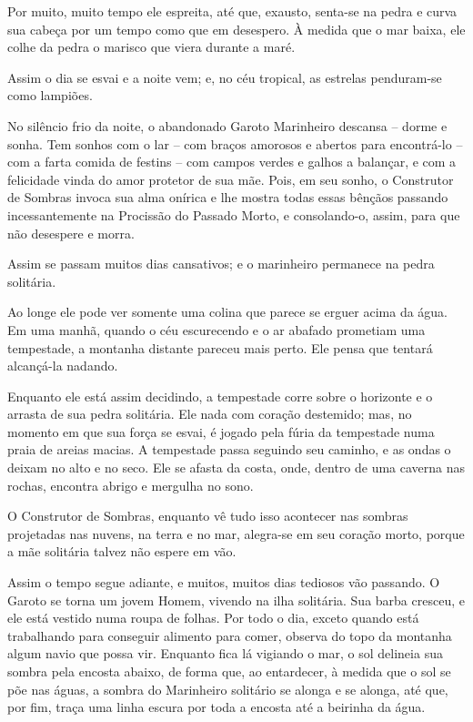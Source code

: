 Por muito, muito tempo ele espreita, até que, exausto, senta-se na pedra
e curva sua cabeça por um tempo como que em desespero. À medida que o
mar baixa, ele colhe da pedra o marisco que viera durante a maré.

Assim o dia se esvai e a noite vem; e, no céu tropical, as estrelas
penduram-se como lampiões.

No silêncio frio da noite, o abandonado Garoto Marinheiro descansa --
dorme e sonha. Tem sonhos com o lar -- com braços amorosos e abertos
para encontrá-lo -- com a farta comida de festins -- com campos verdes e
galhos a balançar, e com a felicidade vinda do amor protetor de sua mãe.
Pois, em seu sonho, o Construtor de Sombras invoca sua alma onírica e
lhe mostra todas essas bênçãos passando incessantemente na Procissão do
Passado Morto, e consolando-o, assim, para que não desespere e morra.

\smallskip
Assim se passam muitos dias cansativos; e o marinheiro permanece na
pedra solitária.

Ao longe ele pode ver somente uma colina que parece se erguer acima da
água. Em uma manhã, quando o céu escurecendo e o ar abafado prometiam
uma tempestade, a montanha distante pareceu mais perto. Ele pensa que
tentará alcançá-la nadando.

Enquanto ele está assim decidindo, a tempestade corre sobre o horizonte
e o arrasta de sua pedra solitária. Ele nada com coração destemido; mas,
no momento em que sua força se esvai, é jogado pela fúria da tempestade
numa praia de areias macias. A tempestade passa seguindo seu caminho, e
as ondas o deixam no alto e no seco. Ele se afasta da costa, onde,
dentro de uma caverna nas rochas, encontra abrigo e mergulha no sono.

O Construtor de Sombras, enquanto vê tudo isso acontecer nas sombras
projetadas nas nuvens, na terra e no mar, alegra-se em seu coração
morto, porque a mãe solitária talvez não espere em vão.

\smallskip
Assim o tempo segue adiante, e muitos, muitos dias tediosos vão
passando. O Garoto se torna um jovem Homem, vivendo na ilha solitária.
Sua barba cresceu, e ele está vestido numa roupa de folhas. Por todo o
dia, exceto quando está trabalhando para conseguir alimento para comer,
observa do topo da montanha algum navio que possa vir. Enquanto fica lá
vigiando o mar, o sol delineia sua sombra pela encosta abaixo, de forma
que, ao entardecer, à medida que o sol se põe nas águas, a sombra do
Marinheiro solitário se alonga e se alonga, até que, por fim, traça uma
linha escura por toda a encosta até a beirinha da água.

